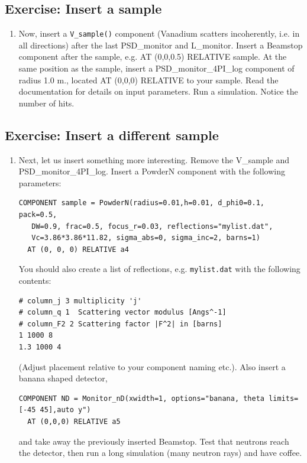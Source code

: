 \subsection{Exercise: Insert a sample}
\begin{enumerate}
\item{Now, insert a \verb+V_sample()+ component (Vanadium scatters
    incoherently, i.e. in all
    directions) after the last PSD\_monitor and L\_monitor. Insert a Beamstop component after the sample, e.g. AT
    (0,0,0.5) RELATIVE sample. 
    At the
    same position as the sample, insert a PSD\_monitor\_4PI\_log component of radius
    1.0 m., located AT (0,0,0) RELATIVE to your sample.
    Read the documentation for details on input parameters.
    Run a simulation. Notice the number of hits.}
\end{enumerate}
\subsection{Exercise: Insert a different sample}
\begin{enumerate}
\item{Next, let us insert something more interesting. Remove the
    V\_sample and  PSD\_monitor\_4PI\_log. Insert a PowderN component
    with the following parameters:
    \begin{verbatim}
COMPONENT sample = PowderN(radius=0.01,h=0.01, d_phi0=0.1, pack=0.5, 
   DW=0.9, frac=0.5, focus_r=0.03, reflections="mylist.dat",
   Vc=3.86*3.86*11.82, sigma_abs=0, sigma_inc=2, barns=1)
  AT (0, 0, 0) RELATIVE a4
\end{verbatim}
You should also create a list of reflections, e.g. \texttt{mylist.dat}
with the following contents:
\begin{verbatim}
# column_j 3 multiplicity 'j'
# column_q 1  Scattering vector modulus [Angs^-1]
# column_F2 2 Scattering factor |F^2| in [barns]
1 1000 8
1.3 1000 4
\end{verbatim}

(Adjust placement relative to your component naming etc.). Also insert
  a banana shaped detector,
\begin{verbatim}
COMPONENT ND = Monitor_nD(xwidth=1, options="banana, theta limits=[-45 45],auto y")
  AT (0,0,0) RELATIVE a5
\end{verbatim}
and take away the previously inserted Beamstop. Test that neutrons
reach the detector, then run a long simulation (many neutron rays) and have coffee.}
\end{enumerate}
